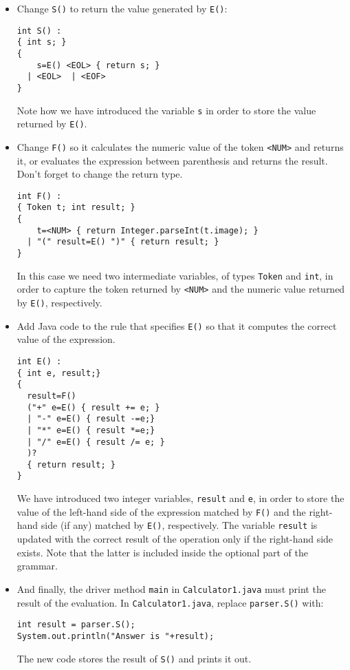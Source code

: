 \documentclass{article}
\begin{document}
\begin{itemize}
\item Change {\tt S()} to return the value generated by {\tt E()}:

\begin{verbatim}
int S() :
{ int s; }
{
    s=E() <EOL> { return s; }
  | <EOL>  | <EOF>
}
\end{verbatim}

Note how we have introduced the variable {\tt s} in order to store the value returned by \verb+E()+.

\item Change {\tt F()} so it calculates the numeric value of the token \verb+<NUM>+ and returns it, or evaluates the expression between parenthesis and returns the result. Don't forget to change the return type.

\begin{verbatim}
int F() :
{ Token t; int result; }
{
    t=<NUM> { return Integer.parseInt(t.image); }
  | "(" result=E() ")" { return result; }
}
\end{verbatim}

In this case we need two intermediate variables, of types {\tt Token} and {\tt int}, in order to capture the token returned by \verb+<NUM>+ and the numeric value returned by \verb+E()+, respectively.

\item Add Java code to the rule that specifies \verb+E()+ so that it computes the correct value of the expression.

\begin{verbatim}
int E() :
{ int e, result;}
{
  result=F() 
  ("+" e=E() { result += e; }
  | "-" e=E() { result -=e;}
  | "*" e=E() { result *=e;} 
  | "/" e=E() { result /= e; }
  )?
  { return result; }
}
\end{verbatim}
We have introduced two integer variables, \verb+result+ and \verb+e+, in order to store the value of the left-hand side of the expression matched by \verb+F()+ and the right-hand side (if any) matched by \verb+E()+, respectively. The variable \verb+result+ is updated with the correct result of the operation only if the right-hand side exists. Note that the latter is included inside the optional part of the grammar.

\item And finally, the driver method {\tt main} in {\tt Calculator1.java} must print the result of the evaluation. In {\tt Calculator1.java}, replace {\tt parser.S()} with:
\begin{verbatim}
int result = parser.S();
System.out.println("Answer is "+result);
\end{verbatim}
The new code stores the result of {\tt S()} and prints it out.

\end{itemize}
\end{document}
